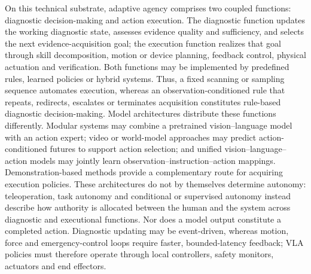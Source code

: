 \documentclass[12pt,a4paper]{article}
\begin{document}
On this technical substrate, adaptive agency comprises two coupled functions: diagnostic decision-making and action execution. The diagnostic function updates the working diagnostic state, assesses evidence quality and sufficiency, and selects the next evidence-acquisition goal; the execution function realizes that goal through skill decomposition, motion or device planning, feedback control, physical actuation and verification. Both functions may be implemented by predefined rules, learned policies or hybrid systems. Thus, a fixed scanning or sampling sequence automates execution, whereas an observation-conditioned rule that repeats, redirects, escalates or terminates acquisition constitutes rule-based diagnostic decision-making. Model architectures distribute these functions differently. Modular systems may combine a pretrained vision--language model with an action expert; video or world-model approaches may predict action-conditioned futures to support action selection; and unified vision--language--action models may jointly learn observation--instruction--action mappings. Demonstration-based methods provide a complementary route for acquiring execution policies. These architectures do not by themselves determine autonomy: teleoperation, task autonomy and conditional or supervised autonomy instead describe how authority is allocated between the human and the system across diagnostic and executional functions. Nor does a model output constitute a completed action. Diagnostic updating may be event-driven, whereas motion, force and emergency-control loops require faster, bounded-latency feedback; VLA policies must therefore operate through local controllers, safety monitors, actuators and end effectors.
\end{document}
